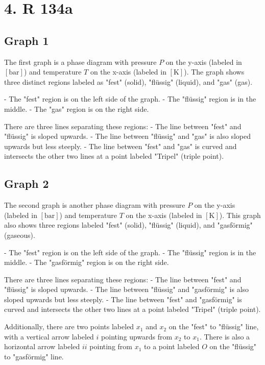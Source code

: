 \section*{4. R 134a}

\subsection*{Graph 1}
The first graph is a phase diagram with pressure \( P \) on the y-axis (labeled in \([ \text{bar} ]\)) and temperature \( T \) on the x-axis (labeled in \([ \text{K} ]\)). The graph shows three distinct regions labeled as "fest" (solid), "flüssig" (liquid), and "gas" (gas). 

- The "fest" region is on the left side of the graph.
- The "flüssig" region is in the middle.
- The "gas" region is on the right side.

There are three lines separating these regions:
- The line between "fest" and "flüssig" is sloped upwards.
- The line between "flüssig" and "gas" is also sloped upwards but less steeply.
- The line between "fest" and "gas" is curved and intersects the other two lines at a point labeled "Tripel" (triple point).

\subsection*{Graph 2}
The second graph is another phase diagram with pressure \( P \) on the y-axis (labeled in \([ \text{bar} ]\)) and temperature \( T \) on the x-axis (labeled in \([ \text{K} ]\)). This graph also shows three regions labeled "fest" (solid), "flüssig" (liquid), and "gasförmig" (gaseous).

- The "fest" region is on the left side of the graph.
- The "flüssig" region is in the middle.
- The "gasförmig" region is on the right side.

There are three lines separating these regions:
- The line between "fest" and "flüssig" is sloped upwards.
- The line between "flüssig" and "gasförmig" is also sloped upwards but less steeply.
- The line between "fest" and "gasförmig" is curved and intersects the other two lines at a point labeled "Tripel" (triple point).

Additionally, there are two points labeled \( x_1 \) and \( x_2 \) on the "fest" to "flüssig" line, with a vertical arrow labeled \( i \) pointing upwards from \( x_2 \) to \( x_1 \). There is also a horizontal arrow labeled \( ii \) pointing from \( x_1 \) to a point labeled \( O \) on the "flüssig" to "gasförmig" line.

